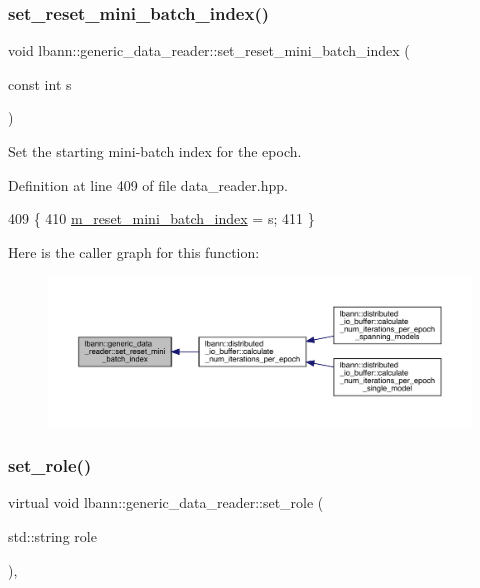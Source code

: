 \subsubsection{\texorpdfstring{set\+\_\+reset\+\_\+mini\+\_\+batch\+\_\+index()}{set\_reset\_mini\_batch\_index()}}
{\footnotesize\ttfamily void lbann\+::generic\+\_\+data\+\_\+reader\+::set\+\_\+reset\+\_\+mini\+\_\+batch\+\_\+index (\begin{DoxyParamCaption}\item[{const int}]{s }\end{DoxyParamCaption})\hspace{0.3cm}{\ttfamily [inline]}}



Set the starting mini-\/batch index for the epoch. 



Definition at line 409 of file data\+\_\+reader.\+hpp.


\begin{DoxyCode}
409                                                \{
410     \hyperlink{classlbann_1_1generic__data__reader_af29f62579a408d1548a124442bcf181d}{m\_reset\_mini\_batch\_index} = s;
411   \}
\end{DoxyCode}
Here is the caller graph for this function\+:\nopagebreak
\begin{figure}[H]
\begin{center}
\leavevmode
\includegraphics[width=350pt]{classlbann_1_1generic__data__reader_a8ac14fee514ad30efe8571ce68c2a95d_icgraph}
\end{center}
\end{figure}
\mbox{\label{classlbann_1_1generic__data__reader_adeb9413be971a0c1454fdeb46fea0716}} 
\subsubsection{\texorpdfstring{set\+\_\+role()}{set\_role()}}
{\footnotesize\ttfamily virtual void lbann\+::generic\+\_\+data\+\_\+reader\+::set\+\_\+role (\begin{DoxyParamCaption}\item[{std\+::string}]{role }\end{DoxyParamCaption})\hspace{0.3cm}{\ttfamily [inline]}, {\ttfamily [virtual]}}

